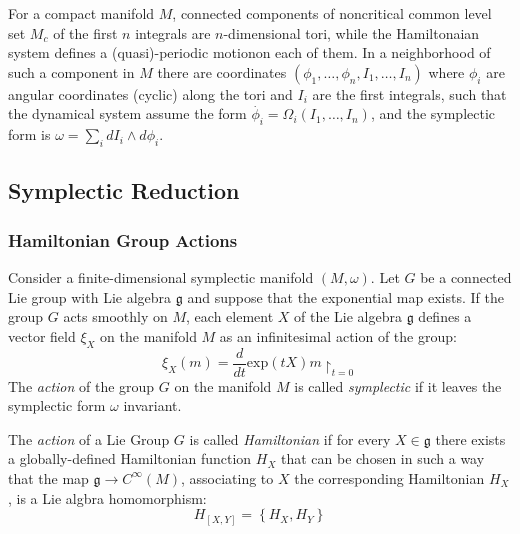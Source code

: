 \begin{thm}

	For a compact manifold $M$, connected components of noncritical common level set $M_c$ of the first $n$ integrals are $n$-dimensional tori, while the Hamiltonaian system defines a (quasi)-periodic motionon each of them. In a neighborhood of such a component in $M$ there are coordinates $ \left( \phi_1, \ldots, \phi_n, I_1, \ldots, I_n \right)$ where $ \phi_i$ are angular coordinates (cyclic) along the tori and $I_i$ are the first integrals, such that the dynamical system assume the form $ \dot{ \phi_i} = \Omega_i (I_1, \ldots, I_n)$, and the symplectic form is $ \omega = \sum_i dI_i \wedge d \phi_i$.

\end{thm}

\subsection{Symplectic Reduction}
\subsubsection{Hamiltonian Group Actions}

\begin{defn}

	Consider a finite-dimensional symplectic manifold $ \left( M, \omega \right)$. Let $G$ be a connected Lie group with Lie algebra $ \mathfrak{g}$ and suppose that the exponential map exists. If the group $G$ acts smoothly on $M$, each element $X$ of the Lie algebra $ \mathfrak{g}$ defines a vector field $ \xi_X$ on the manifold $M$ as an infinitesimal action of the group:
	\[
		\xi_X(m) = \frac{d}{dt} \mathrm{exp}(tX)m \restriction_{t=0}
	\]
The \textit{action} of the group $G$ on the manifold $M$ is called \textit{symplectic} if it leaves the symplectic form $ \omega$ invariant.	

\end{defn}

\begin{defn}

The \textit{action} of a Lie Group $G$ is called \textit{Hamiltonian} if for every $X \in \mathfrak{g}$ there exists a globally-defined Hamiltonian function $H_X$ that can be chosen in such a way that the map $ \mathfrak{g} \to C^{\infty}( M ) $, associating to $X$ the corresponding Hamiltonian $H_X$, is a Lie algbra homomorphism:
\[
	H_{ \left[ X,Y \right] } = \left\{ H_X, H_Y \right\}
\]
\end{defn}

